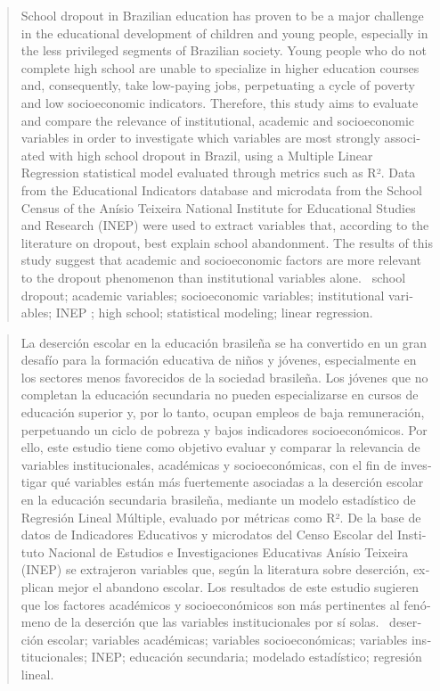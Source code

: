 \documentclass[english, spanish, brazilian]{RBIEarticle} %
\begin{document}
\begin{otherlanguage}{english}
\begin{abstract}
School dropout in Brazilian education has proven to be a major challenge in the educational development of children and young people, especially in the less privileged segments of Brazilian society. Young people who do not complete high school are unable to specialize in higher education courses and, consequently, take low-paying jobs, perpetuating a cycle of poverty and low socioeconomic indicators. Therefore, this study aims to evaluate and compare the relevance of institutional, academic and socioeconomic variables in order to investigate which variables are most strongly associated with high school dropout in Brazil, using a Multiple Linear Regression statistical model evaluated through metrics such as R². Data from the Educational Indicators database and microdata from the School Census of the Anísio Teixeira National Institute for Educational Studies and Research (INEP) were used to extract variables that, according to the literature on dropout, best explain school abandonment. The results of this study suggest that academic and socioeconomic factors are more relevant to the dropout phenomenon than institutional variables alone.
\keywords\ school dropout; academic variables; socioeconomic variables; institutional variables; INEP ; high school; statistical modeling; linear regression.
\end{abstract}
\end{otherlanguage}

\begin{otherlanguage}{spanish}
\begin{abstract}
La deserción escolar en la educación brasileña se ha convertido en un gran desafío para la formación educativa de niños y jóvenes, especialmente en los sectores menos favorecidos de la sociedad brasileña. Los jóvenes que no completan la educación secundaria no pueden especializarse en cursos de educación superior y, por lo tanto, ocupan empleos de baja remuneración, perpetuando un ciclo de pobreza y bajos indicadores socioeconómicos. Por ello, este estudio tiene como objetivo evaluar y comparar la relevancia de variables institucionales, académicas y socioeconómicas, con el fin de investigar qué variables están más fuertemente asociadas a la deserción escolar en la educación secundaria brasileña, mediante un modelo estadístico de Regresión Lineal Múltiple, evaluado por métricas como R². De la base de datos de Indicadores Educativos y microdatos del Censo Escolar del Instituto Nacional de Estudios e Investigaciones Educativas Anísio Teixeira (INEP) se extrajeron variables que, según la literatura sobre deserción, explican mejor el abandono escolar. Los resultados de este estudio sugieren que los factores académicos y socioeconómicos son más pertinentes al fenómeno de la deserción que las variables institucionales por sí solas.
\keywords\ deserción escolar; variables académicas; variables socioeconómicas; variables institucionales; INEP; educación secundaria; modelado estadístico; regresión lineal.
\end{abstract}
\end{otherlanguage}
\end{document}
